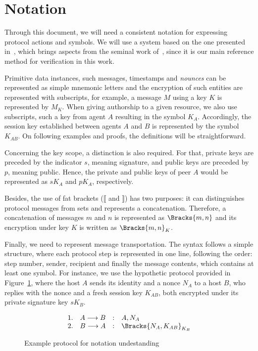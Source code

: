 \section{Notation}
Through this document, we will need a consistent notation for expressing protocol actions and symbols. We will use a system based on the one presented in~\cite{Bella2007}, which brings aspects from the seminal work of~\cite{Burrows90}, since it is our main reference method for verification in this work.

Primitive data instances, such messages, timestamps and \textit{nounces} can be represented as simple mnemonic letters and the encryption of such entities are represented with subscripts, for example, a message \(M\) using a key \(K\) is represented by \(M_K\). When giving authorship to a given resource, we also use subscripts, such a key from agent \(A\) resulting in the symbol \(K_A\). Accordingly, the session key established between agents \(A\) and \(B\) is represented by the symbol \(K_{AB}\). On following examples and proofs, the definitions will be straightforward.

Concerning the key scope, a distinction is also required. For that, private keys are preceded by the indicator \(s\), meaning signature, and public keys are preceded by \(p\), meaning public. Hence, the private and public keys of peer \(A\) would be represented as \(sK_A\) and \(pK_A\), respectively.

Besides, the use of fat brackets (\(\lBrack \) and \(\rBrack \)) has two purposes: it can distinguishes protocol messages from sets and represents a concatenation. Therefore, a concatenation of messages \(m\) and \(n\) is represented as \(\Bracks{m,n}\) and its encryption under key \(K\) is written as \(\Bracks{m,n}_K\).

Finally, we need to represent message transportation. The syntax follows a simple structure, where each protocol step is represented in one line, following the order: step number, sender, recipient and finally the message contents, which contains at least one symbol. For instance, we use the hypothetic protocol provided in Figure~\ref{prt:notation-example}, where the host \(A\) sends its identity and a nonce \(N_A\) to a host \(B\), who replies with the nonce and a fresh session key \(K_{AB}\), both encrypted under its private signature key \(sK_B\).

\begin{figure}[ht]\label{prt:notation-example}
  \centering
    \[
    \begin{array}{rlcl}
      1. & A \longrightarrow B &:& A, N_A \\
      2. & B \longrightarrow A &:& \Bracks{N_A, K_{AB}}_{K_B} \\
    \end{array}
    \]
  \caption{Example protocol for notation undestanding}
\end{figure}


